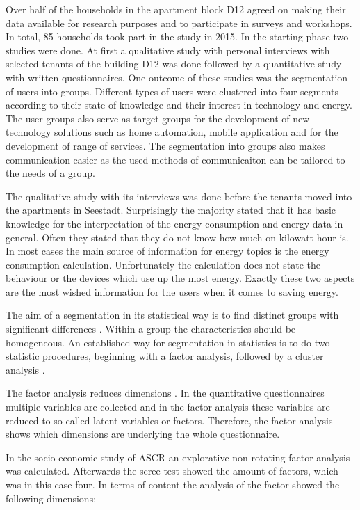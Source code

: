 Over half of the households in the apartment block D12 agreed on making their data available for research purposes and to participate in surveys and workshops. In total, 85 households took part in the study in 2015. In the starting phase two studies were done. At first a qualitative study with personal interviews with selected tenants of the building D12 was done followed by a quantitative study with written questionnaires. One outcome of these studies was the segmentation of users into groups. Different types of users were clustered into four segments according to their state of knowledge and their interest in technology and energy. The user groups also serve as target groups for the development of new technology solutions such as home automation, mobile application and for the development of range of services. The segmentation into groups also makes communication easier as the used methods of communicaiton can be tailored to the needs of a group.

The qualitative study with its interviews was done before the tenants moved into the apartments in Seestadt. Surprisingly the majority stated that it has basic knowledge for the interpretation of the energy consumption and energy data in general. Often they stated that they do not know how much on kilowatt hour is. In most cases the main source of information for energy topics is the energy consumption calculation. Unfortunately the calculation does not state the behaviour or the devices which use up the most energy. Exactly these two aspects are the most wished information for the users when it comes to saving energy.

The aim of a segmentation in its statistical way is to find distinct groups with significant differences \cite{punj1983cluster}. Within a group the characteristics should be homogeneous. An established way for segmentation in statistics is to do two statistic procedures, beginning with a factor analysis, followed by a cluster analysis \cite{tuffery2011data}.

The factor analysis reduces dimensions \cite{williams2010exploratory}. In the quantitative questionnaires multiple variables are collected and in the factor analysis these variables are reduced to so called latent variables or factors. Therefore, the factor analysis shows which dimensions are underlying the whole questionnaire.

In the socio economic study of ASCR an explorative non-rotating factor analysis was calculated. Afterwards the scree test showed the amount of factors, which was in this case four. In terms of content the analysis of the factor showed the following dimensions:

